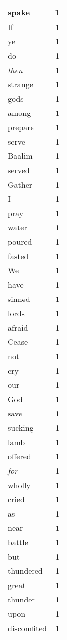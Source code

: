 \begin{center}
\begin{longtable}{l|r}
spake & 1 \\ \hline
If & 1 \\ \hline
ye & 1 \\ \hline
do & 1 \\ \hline
\emph{then} & 1 \\ \hline
strange & 1 \\ \hline
gods & 1 \\ \hline
among & 1 \\ \hline
prepare & 1 \\ \hline
serve & 1 \\ \hline
Baalim & 1 \\ \hline
served & 1 \\ \hline
Gather & 1 \\ \hline
I & 1 \\ \hline
pray & 1 \\ \hline
water & 1 \\ \hline
poured & 1 \\ \hline
fasted & 1 \\ \hline
We & 1 \\ \hline
have & 1 \\ \hline
sinned & 1 \\ \hline
lords & 1 \\ \hline
afraid & 1 \\ \hline
Cease & 1 \\ \hline
not & 1 \\ \hline
cry & 1 \\ \hline
our & 1 \\ \hline
God & 1 \\ \hline
save & 1 \\ \hline
sucking & 1 \\ \hline
lamb & 1 \\ \hline
offered & 1 \\ \hline
\emph{for} & 1 \\ \hline
wholly & 1 \\ \hline
cried & 1 \\ \hline
as & 1 \\ \hline
near & 1 \\ \hline
battle & 1 \\ \hline
but & 1 \\ \hline
thundered & 1 \\ \hline
great & 1 \\ \hline
thunder & 1 \\ \hline
upon & 1 \\ \hline
discomfited & 1 \\ \hline

\end{longtable}
\end{center}
